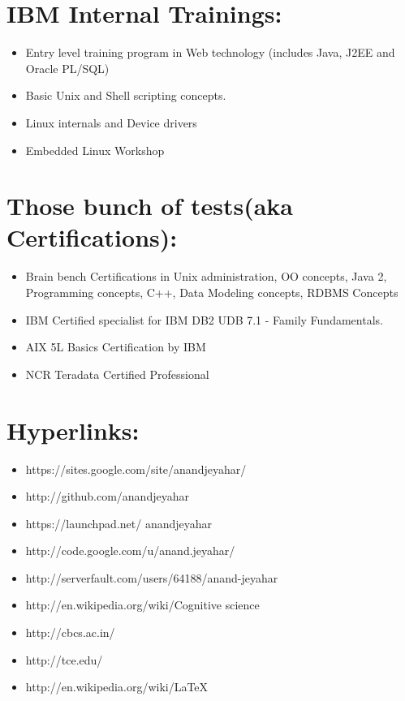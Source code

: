 \section {IBM Internal Trainings:}
	\begin {itemize}
		
		\item Entry level training program in Web technology (includes Java, J2EE and Oracle PL/SQL)
		
		\item Basic Unix and Shell scripting concepts.
		
		\item Linux internals and Device drivers
		\item Embedded Linux Workshop
	\end {itemize}

\section {Those bunch of tests(aka Certifications):}
	\begin {itemize}
	
		\item Brain bench Certifications in Unix administration, OO concepts, Java 2, Programming concepts, C++, Data Modeling concepts, RDBMS Concepts
	
		\item IBM Certified specialist for IBM DB2 UDB 7.1 - Family Fundamentals.
		
		\item AIX 5L Basics Certification by IBM
		
		\item NCR Teradata Certified Professional
	\end {itemize}

\section {Hyperlinks:}
	\begin {itemize}

		\item https://sites.google.com/site/anandjeyahar/

		\item http://github.com/anandjeyahar

		\item https://launchpad.net/ anandjeyahar

		\item http://code.google.com/u/anand.jeyahar/

		\item http://serverfault.com/users/64188/anand-jeyahar

		\item http://en.wikipedia.org/wiki/Cognitive science

		\item http://cbcs.ac.in/

		\item http://tce.edu/

		\item http://en.wikipedia.org/wiki/LaTeX
		
	\end{itemize}

